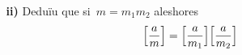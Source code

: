 \documentclass[a4paper]{article}
\begin{document}
\begin{enumerate}
    \item[] \begin{enumerate}
        \item[\textbf{ii)}] Deduïu que si~\(m=m_{1}m_{2}\) aleshores
            \[
                \Bigl[\frac{a}{m}\Bigr]
                =
                \Bigl[\frac{a}{m_{1}}\Bigr]
                \Bigl[\frac{a}{m_{2}}\Bigr]
            \]
    \end{enumerate}
\end{enumerate}
\end{document}
